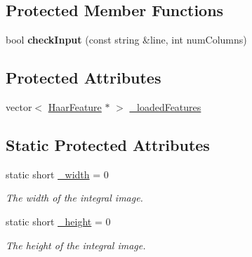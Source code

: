 \subsection*{Protected Member Functions}
\begin{DoxyCompactItemize}
\item 
\hypertarget{classMultiBoost_1_1HaarData_a5a09a62a0f69dec39ff970025e4a9a70}{bool {\bfseries check\-Input} (const string \&line, int num\-Columns)}\label{classMultiBoost_1_1HaarData_a5a09a62a0f69dec39ff970025e4a9a70}

\end{DoxyCompactItemize}
\subsection*{Protected Attributes}
\begin{DoxyCompactItemize}
\item 
vector$<$ \hyperlink{classMultiBoost_1_1HaarFeature}{Haar\-Feature} $\ast$ $>$ \hyperlink{classMultiBoost_1_1HaarData_a9afda9dde6bbde709c5e75246e52d56e}{\-\_\-loaded\-Features}
\end{DoxyCompactItemize}
\subsection*{Static Protected Attributes}
\begin{DoxyCompactItemize}
\item 
\hypertarget{classMultiBoost_1_1HaarData_a73862205f817a06ff1c09aaffe389d31}{static short \hyperlink{classMultiBoost_1_1HaarData_a73862205f817a06ff1c09aaffe389d31}{\-\_\-width} = 0}\label{classMultiBoost_1_1HaarData_a73862205f817a06ff1c09aaffe389d31}

\begin{DoxyCompactList}\small\item\em The width of the integral image. \end{DoxyCompactList}\item 
\hypertarget{classMultiBoost_1_1HaarData_ae0233232368d1411399af56a0966bd0d}{static short \hyperlink{classMultiBoost_1_1HaarData_ae0233232368d1411399af56a0966bd0d}{\-\_\-height} = 0}\label{classMultiBoost_1_1HaarData_ae0233232368d1411399af56a0966bd0d}

\begin{DoxyCompactList}\small\item\em The height of the integral image. \end{DoxyCompactList}\end{DoxyCompactItemize}



